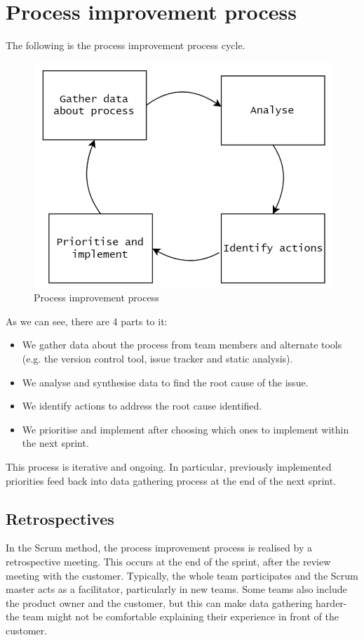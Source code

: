 \documentclass[a4paper, openany]{memoir}
\begin{document}
\section{Process improvement process}
The following is the process improvement process cycle.
\begin{figure}[H]
    \centering
    \includegraphics[scale=0.4]{src/6 process improvement process.PNG}
    \caption{Process improvement process}
\end{figure}
\noindent As we can see, there are 4 parts to it:
\begin{itemize}
    \item We gather data about the process from team members and alternate tools (e.g. the version control tool, issue tracker and static analysis).
    \item We analyse and synthesise data to find the root cause of the issue.
    \item We identify actions to address the root cause identified.
    \item We prioritise and implement after choosing which ones to implement within the next sprint.
\end{itemize}
This process is iterative and ongoing. In particular, previously implemented priorities feed back into data gathering process at the end of the next sprint.

\subsection{Retrospectives}
In the Scrum method, the process improvement process is realised by a retrospective meeting. This occurs at the end of the sprint, after the review meeting with the customer. Typically, the whole team participates and the Scrum master acts as a facilitator, particularly in new teams. Some teams also include the product owner and the customer, but this can make data gathering harder- the team might not be comfortable explaining their experience in front of the customer. 
\end{document}
